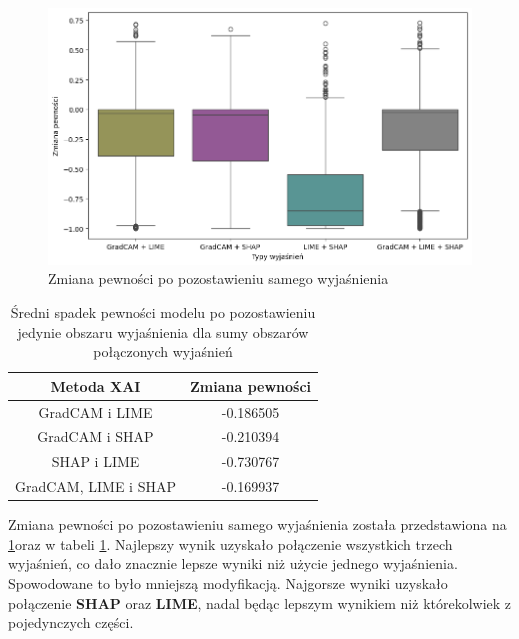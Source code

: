 \begin{figure}[h]
	\centering\includegraphics[width=.9\textwidth]{img/combine_confidence_exp_or}
	\caption{Zmiana pewności po pozostawieniu samego wyjaśnienia}  \label{rys:combineandconfidenceor}
\end{figure}
\begin{table}[h]
	\centering
	\begin{tabular}{|c|c|}
		\hline
		\textbf{Metoda XAI}  & Zmiana pewności \\
		\hline
		GradCAM i LIME       & -0.186505       \\
		\hline
		GradCAM i SHAP       & -0.210394       \\
		\hline
		SHAP i LIME          & -0.730767       \\
		\hline
		GradCAM, LIME i SHAP & -0.169937       \\
		\hline
	\end{tabular}
	\caption{Średni spadek pewności modelu po pozostawieniu jedynie obszaru wyjaśnienia dla sumy obszarów połączonych wyjaśnień}
	\label{tab:combineandconfidenceor}
\end{table}
Zmiana pewności po pozostawieniu samego wyjaśnienia została przedstawiona na \ref{rys:combineandconfidenceor}oraz w tabeli \ref{tab:combineandconfidenceor}.
Najlepszy wynik uzyskało połączenie wszystkich trzech wyjaśnień, co dało znacznie lepsze wyniki niż użycie jednego wyjaśnienia.
Spowodowane to było mniejszą modyfikacją.
Najgorsze wyniki uzyskało połączenie \textbf{SHAP} oraz \textbf{LIME}, nadal będąc lepszym wynikiem niż którekolwiek z pojedynczych części.
\vspace{1cm}

